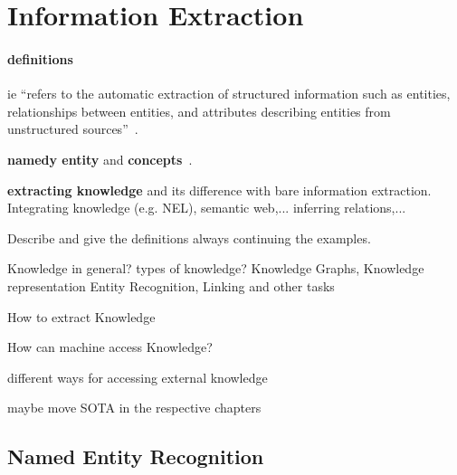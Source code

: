 

\section{Information Extraction}
\paragraph{definitions}
\begin{definition}
\Ac{ie} ``refers to
the automatic extraction of structured information such as entities, relationships
between entities, and attributes describing entities from unstructured sources''~\cite{infoextraction2008}.
\end{definition}


\textbf{namedy entity} and \textbf{concepts}~\cite{entityorientedsearch2018}.

\textbf{extracting knowledge} and its difference with bare information extraction. Integrating knowledge (e.g. NEL), semantic web,... inferring relations,...

Describe and give the definitions always continuing the examples.

Knowledge in general? types of knowledge? Knowledge Graphs, Knowledge representation
Entity Recognition, Linking and other tasks

How to extract Knowledge

How can machine access Knowledge?

different ways for accessing external knowledge

maybe move SOTA in the respective chapters
\subsection{Named Entity Recognition}



